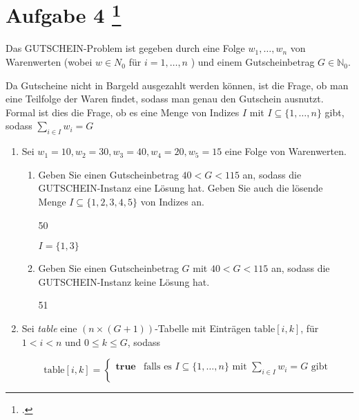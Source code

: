 \documentclass{lehramt-informatik-aufgabe}
\begin{document}
\section{Aufgabe 4
\footcite{66115:2020:09}}

Das GUTSCHEIN-Problem ist gegeben durch eine Folge $w_1, \dots, w_n$ von
Warenwerten (wobei $w \in N_0$ für $i = 1, \dots, n$ ) und einem
Gutscheinbetrag $G \in \mathbb{N}_0$.

Da Gutscheine nicht in Bargeld ausgezahlt werden können, ist die Frage,
ob man eine Teilfolge der Waren findet, sodass man genau den Gutschein
ausnutzt. Formal ist dies die Frage, ob es eine Menge von Indizes $I$
mit $I \subseteq \{1, \dots, n \}$ gibt, sodass $\sum_{i \in I} w_i = G$
\begin{enumerate}


\item Sei $w_1 = 10, w_2 = 30, w_3 = 40, w_4 = 20, w_5 = 15$ eine Folge
von Warenwerten.

\begin{enumerate}


\item Geben Sie einen Gutscheinbetrag $40 < G < 115$ an, sodass die
GUT\-SCHEIN-Instanz eine Lösung hat. Geben Sie auch die lösende Menge $I
\subseteq \{ 1, 2, 3, 4, 5 \}$ von Indizes an.

\begin{liAntwort}
50

$I = \{ 1, 3 \}$
\end{liAntwort}


\item Geben Sie einen Gutscheinbetrag $G$ mit $40 < G < 115$ an, sodass
die GUTSCHEIN-Instanz keine Lösung hat.

\begin{liAntwort}
51
\end{liAntwort}

\end{enumerate}


\item Sei \emph{table} eine $(n \times (G + 1))$-Tabelle mit Einträgen
$\text{table}[i,k]$, für $1 < i < n$ und $0 \leq k \leq G$, sodass

\begin{liAntwort}
\begin{equation*}
\text{table}[i,k] =
\begin{cases}
\textbf{true} &
\text{falls es } I \subseteq \{1, \dots, n \} \text{ mit }
\sum_{i \in I} w_i = G \text{ gibt}\\


\end{cases}
\end{equation*}
\end{liAntwort}
\end{enumerate}
\end{document}
